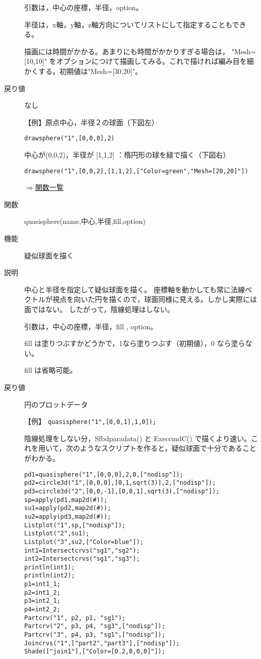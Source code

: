\documentclass[papersize,a4paper,12pt,uplatex]{jsarticle}
\begin{document}
\begin{description}
引数は，中心の座標，半径，option。 

半径は，x軸，y軸，z軸方向についてリストにして指定することもできる。

描画には時間がかかる。あまりにも時間がかかりすぎる場合は， "Mesh=[10,10]" をオプションにつけて描画してみる。これで描ければ編み目を細かくする。初期値は"Mesh=[30,20]"。
\item[戻り値] なし

\vspace{\baselineskip}
【例】原点中心，半径２の球面（下図左）

\verb|drawsphere("1",[0,0,0],2) |

   中心が(0,0,2)，半径が [1,1,2]  ：楕円形の球を緑で描く（下図右）

\verb|drawsphere("1",[0,0,2],[1,1,2],["Color=green","Mesh=[20,20]"])|

  \hspace{10mm}  

\begin{flushright} \hyperlink{functionlist}{$\Rightarrow$関数一覧}\end{flushright}

\hypertarget{quasisphere}{}
\item[関数] quasisphere(name,中心,半径,fill,option)
\item[機能] 疑似球面を描く
\item[説明] 中心と半径を指定して疑似球面を描く。
座標軸を動かしても常に法線ベクトルが視点を向いた円を描くので，球面同様に見える。しかし実際には面ではない。 したがって，陰線処理はしない。

引数は，中心の座標，半径，fill , option。

fill は塗りつぶすかどうかで，1なら塗りつぶす（初期値），0 なら塗らない。

fill は省略可能。

\item[戻り値] 円のプロットデータ

\vspace{\baselineskip}
【例】 \verb|quasisphere("1",[0,0,1],1,0]);|

  

陰線処理をしない分，Sfbdparadata() と ExeccmdC() で描くより速い。これを用いて，次のようなスクリプトを作ると，疑似球面で十分であることがわかる。

\begin{verbatim}
pd1=quasisphere("1",[0,0,0],2,0,["nodisp"]);
pd2=circle3d("1",[0,0,0],[0,1,sqrt(3)],2,["nodisp"]);
pd3=circle3d("2",[0,0,-1],[0,0,1],sqrt(3),["nodisp"]);
sp=apply(pd1,map2d(#));
su1=apply(pd2,map2d(#));
su2=apply(pd3,map2d(#));
Listplot("1",sp,["nodisp"]);
Listplot("2",su1);
Listplot("3",su2,["Color=blue"]);
int1=Intersectcrvs("sg1","sg2");
int2=Intersectcrvs("sg1","sg3");
println(int1);
println(int2);
p1=int1_1;
p2=int1_2;
p3=int2_1;
p4=int2_2;
Partcrv("1", p2, p1, "sg1");
Partcrv("2", p3, p4, "sg3",["nodisp"]);
Partcrv("3", p4, p3, "sg1",["nodisp"]);
Joincrvs("1",["part2","part3"],["nodisp"]);
Shade(["join1"],["Color=[0.2,0,0,0]"]);
\end{verbatim}


\end{description}
\end{document}
